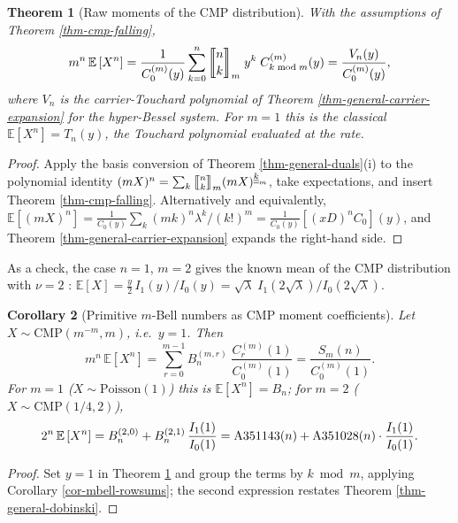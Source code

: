 \documentclass[a4paper]{amsart}
\numberwithin{equation}{section}
\newcommand{\mStirling}[0]{\genfrac{\llbracket}{\rrbracket}{0pt}{}}
\newcommand{\uuline}[1]{\underline{\underline{#1}}}
\newtheorem{theorem}{Theorem}[section]
\newtheorem{corollary}[theorem]{Corollary}
\begin{document}
\begin{theorem}[Raw moments of the CMP distribution]\label{thm-cmp-moments}
With the assumptions of Theorem \ref{thm-cmp-falling},
\[
m^{n}\, \mathbb{E}\left[X^{n}\right] = \frac{1}{C^{(m)}_0(y)} \sum_{k=0}^{n} \mStirling{n}{k}_m\; y^{k}\; C^{(m)}_{k \bmod m}(y) = \frac{V_n(y)}{C^{(m)}_0(y)},
\]
where $V_n$ is the carrier-Touchard polynomial of Theorem \ref{thm-general-carrier-expansion} for the hyper-Bessel system. For $m = 1$ this is the classical $\mathbb{E}[X^n] = T_n(y)$, the Touchard polynomial evaluated at the rate.
\end{theorem}
\begin{proof}
Apply the basis conversion of Theorem \ref{thm-general-duals}(i) to the polynomial identity $(mX)^n = \sum_k \mStirling{n}{k}_m (mX)^{\uuline{k}_m}$, take expectations, and insert Theorem \ref{thm-cmp-falling}.
Alternatively and equivalently, $\mathbb{E}[(mX)^n] = \frac{1}{C_0(y)}\sum_k (mk)^n \lambda^k/(k!)^m = \frac{1}{C_0(y)}\left[(xD)^n C_0\right](y)$, and Theorem \ref{thm-general-carrier-expansion} expands the right-hand side.
\end{proof}

As a check, the case $n = 1$, $m = 2$ gives the known mean of the CMP distribution with $\nu = 2$ \cite{dalyGaunt2016}: $\mathbb{E}[X] = \tfrac{y}{2}\,I_1(y)/I_0(y) = \sqrt{\lambda}\; I_1(2\sqrt{\lambda})/I_0(2\sqrt{\lambda})$.

\begin{corollary}[Primitive $m$-Bell numbers as CMP moment coefficients]\label{cor-cmp-mbell}
Let $X \sim \mathrm{CMP}(m^{-m}, m)$, i.e.\ $y = 1$. Then
\[
m^{n}\,\mathbb{E}\left[X^{n}\right] = \sum_{r=0}^{m-1} B^{(m,r)}_n\; \frac{C^{(m)}_r(1)}{C^{(m)}_0(1)} = \frac{S_m(n)}{C^{(m)}_0(1)}.
\]
For $m=1$ ($X \sim \mathrm{Poisson}(1)$) this is $\mathbb{E}[X^n] = B_n$; for $m = 2$ ($X \sim \mathrm{CMP}(1/4, 2)$),
\[
2^{n}\, \mathbb{E}\left[X^{n}\right] = B^{(2,0)}_n + B^{(2,1)}_n\,\frac{I_1(1)}{I_0(1)} = \textup{A351143}(n) + \textup{A351028}(n)\cdot\frac{I_1(1)}{I_0(1)}.
\]
\end{corollary}
\begin{proof}
Set $y = 1$ in Theorem \ref{thm-cmp-moments} and group the terms by $k \bmod m$, applying Corollary \ref{cor-mbell-rowsums}; the second expression restates Theorem \ref{thm-general-dobinski}.
\end{proof}
\end{document}
